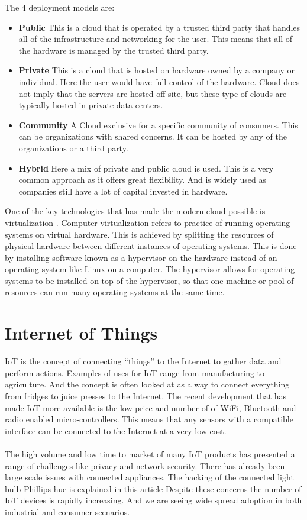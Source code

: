 \documentclass[]{uiophd}
\begin{document}
The 4 deployment models are:
\begin{itemize}
\item \textbf{Public} This is a cloud that is operated by a trusted third party that handles all of the infrastructure and networking for the user. This means that all of the hardware is managed by the trusted third party.
\item \textbf{Private} This is a cloud that is hosted on hardware owned by a company or individual. Here the user would have full control of the hardware. Cloud does not imply that the servers are hosted off site, but these type of clouds are typically hosted in private data centers.  
\item \textbf{Community} A Cloud exclusive for a specific community of consumers. This can be organizations with shared concerns. It can be hosted by any of the organizations or a third party. 
\item \textbf{Hybrid} Here a mix of private and public cloud is used. This is a very common approach as it offers great flexibility. And is widely used as companies still have a lot of capital invested in hardware.
\end{itemize}
 
One of the key technologies that has made the modern cloud possible is virtualization \cite{virt}. Computer virtualization refers to practice of running operating systems on virtual hardware. This is achieved by splitting the resources of physical hardware between different instances of operating systems. This is done by installing software known as a hypervisor on the hardware instead of an operating system like Linux on a computer. The hypervisor allows for operating systems to be installed on top of the hypervisor, so that one machine or pool of resources can run many operating systems at the same time.\cite{1430631}


\section{Internet of Things}
IoT is the concept of connecting “things” to the Internet to gather data and perform actions. Examples of uses for IoT range from manufacturing to agriculture. And the concept is often looked at as a way to connect everything from fridges to juice presses to the Internet. The recent development that has made IoT more available is the low price and number of of WiFi, Bluetooth and radio enabled micro-controllers.  This means that any sensors with a compatible interface can be connected to the Internet at a very low cost.
\\\\
The high volume and low time to market of many IoT products has presented a range of challenges like privacy and network security. There has already been large scale issues with connected appliances. The hacking of the connected light bulb Phillips hue is explained in this article \cite{6997469} Despite these concerns the number of IoT devices is rapidly increasing. And we are seeing wide spread adoption in both industrial and consumer scenarios. 
\end{document}
